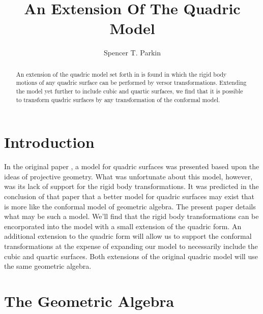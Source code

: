 \documentclass{birkjour}
\theoremstyle{definition}
\theoremstyle{remark}
\numberwithin{equation}{section}
\begin{document}
\title{An Extension Of The Quadric Model}

\author{Spencer T. Parkin}
\address{%
2113 S. Claremont Dr.\\
Bountiful, Utah  84010\\
USA}





\begin{abstract}
An extension of the quadric model set forth in \cite{Parkin12} is
found in which the rigid body motions of any quadric surface can be performed
by versor transformations.  Extending the model yet further to include
cubic and quartic surfaces, we find that it is possible to transform
quadric surfaces by any transformation of the conformal model.
\end{abstract}

\maketitle

\section{Introduction}

In the original paper \cite{Parkin12}, a model for quadric surfaces was
presented based upon the ideas of projective geometry.  What was unfortunate
about this model, however, was its lack of support for the rigid body transformations.  It was
predicted in the conclusion of that paper that a better model for quadric
surfaces may exist that is more like the conformal model of geometric algebra.
The present paper details what may be such a model.  We'll find that the rigid
body transformations can be encorporated into the model with a small
extension of the quadric form.  An additional extension to the quadric form
will allow us to support the conformal transformations at the expense of
expanding our model to necessarily include the cubic and quartic surfaces.  Both extensions
of the original quadric model will use the same geometric algebra.

\section{The Geometric Algebra}
\end{document}
